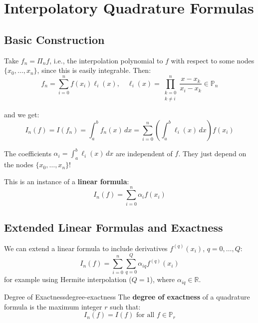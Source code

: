 \section{Interpolatory Quadrature Formulas}

\subsection{Basic Construction}

Take $f_n = \Pi_n f$, i.e., the interpolation polynomial to $f$ with respect to some nodes $\{x_0, \ldots, x_n\}$, since this is easily integrable. Then:
\begin{equation}
    f_n = \sum_{i=0}^n f(x_i) \ell_i(x), \quad \ell_i(x) = \prod_{\substack{k=0\\k \neq i}}^n \frac{x - x_k}{x_i - x_k} \in \mathbb{P}_n
\end{equation}

and we get:
\begin{equation}
    I_n(f) = I(f_n) = \int_a^b f_n(x) \, dx = \sum_{i=0}^n \left(\int_a^b \ell_i(x) \, dx\right) f(x_i)
\end{equation}

The coefficients $\alpha_i = \int_a^b \ell_i(x) \, dx$ are independent of $f$. They just depend on the nodes $\{x_0, \ldots, x_n\}$!

This is an instance of a \textbf{linear formula}:
\begin{equation}
    I_n(f) = \sum_{i=0}^n \alpha_i f(x_i)
\end{equation}

\subsection{Extended Linear Formulas and Exactness}

We can extend a linear formula to include derivatives $f^{(q)}(x_i)$, $q = 0, \ldots, Q$:
\begin{equation}
    I_n(f) = \sum_{i=0}^n \sum_{q=0}^Q \alpha_{iq} f^{(q)}(x_i)
\end{equation}
for example using Hermite interpolation ($Q = 1$), where $\alpha_{iq} \in \mathbb{R}$.

\begin{definition}{Degree of Exactness}{degree-exactness}
The \textbf{degree of exactness} of a quadrature formula is the maximum integer $r$ such that:
\[I_n(f) = I(f) \text{ for all } f \in \mathbb{P}_r\]
\end{definition}

